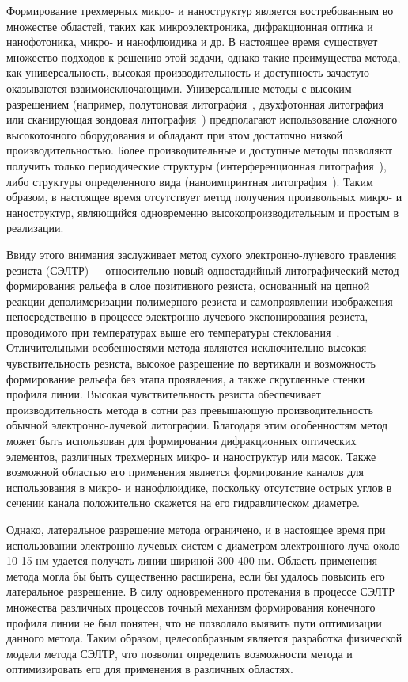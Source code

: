 \actuality

Формирование трехмерных микро- и наноструктур является востребованным во множестве областей, таких как микроэлектроника, дифракционная оптика и нанофотоника, микро- и нанофлюидика и др. В настоящее время существует множество подходов к решению этой задачи, однако такие преимущества метода, как универсальность, высокая производительность и доступность зачастую оказываются взаимоисключающими. Универсальные методы с высоким разрешением (например, полутоновая литография~\cite{GL_general}, двухфотонная литография~\cite{TPL_castle} или сканирующая зондовая литография~\cite{SPL_mechanical}) предполагают использование сложного высокоточного оборудования и обладают при этом достаточно низкой производительностью. Более производительные и доступные методы позволяют получить только периодические структуры (интерференционная литография~\cite{IL_metamaterials}), либо структуры определенного вида (наноимпринтная литография~\cite{NIL_1}). Таким образом, в настоящее время отсутствует метод получения произвольных микро- и наноструктур, являющийся одновременно высокопроизводительным и простым в реализации.

Ввиду этого внимания заслуживает метод сухого электронно-лучевого травления резиста (СЭЛТР) –- относительно новый одностадийный литографический метод формирования рельефа в слое позитивного резиста, основанный на цепной реакции деполимеризации полимерного резиста и самопроявлении изображения непосредственно в процессе электронно-лучевого экспонирования резиста, проводимого при температурах выше его температуры стеклования~\cite{Bruk_2013, Bruk_2016_mee}. Отличительными особенностями метода являются исключительно высокая чувствительность резиста, высокое разрешение по вертикали и возможность формирование рельефа без этапа проявления, а также скругленные стенки профиля линии. Высокая чувствительность резиста обеспечивает производительность метода в сотни раз превышающую производительность обычной электронно-лучевой литографии. Благодаря этим особенностям метод может быть использован для формирования дифракционных оптических элементов, различных трехмерных микро- и наноструктур или масок. Также возможной областью его применения является формирование каналов для использования в микро- и нанофлюидике, поскольку отсутствие острых углов в сечении канала положительно скажется на его гидравлическом диаметре.

Однако, латеральное разрешение метода ограничено, и в настоящее время при использовании электронно-лучевых систем с диаметром электронного луча около 10-15 нм удается получать линии шириной 300-400 нм. Область применения метода могла бы быть существенно расширена, если бы удалось повысить его латеральное разрешение. В силу одновременного протекания в процессе СЭЛТР множества различных процессов точный механизм формирования конечного профиля линии не был понятен, что не позволяло выявить пути оптимизации данного метода. Таким образом, целесообразным является разработка физической модели метода СЭЛТР, что позволит определить возможности метода и оптимизировать его для применения в различных областях.


